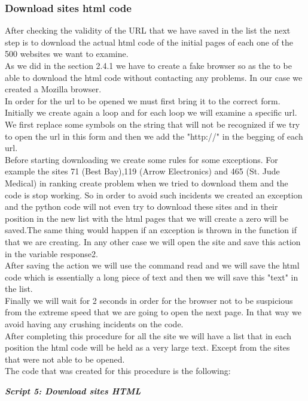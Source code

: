 \documentclass{article}
\begin{document}
\subsubsection{Download sites html code}
After checking the validity of the URL that we have saved in the list the next step is to download the actual html code of the initial pages of each one of the 500 websites we want to examine.\\
As we did in the section 2.4.1 we have to create a fake browser so as the to be able to download the html code without contacting any problems. In our case we created a Mozilla browser.\\
In order for the url to be opened we must first bring it to the correct form. Initially we create again a loop and for each loop we will examine a specific url. We first replace some symbols on the string that will not be recognized if we try to open the url in this form and then we add the "http://" in the begging of each url.\\ 
Before starting downloading we create some rules for some exceptions. For example the sites 71 (Best Bay),119 (Arrow Electronics) and 465 (St. Jude Medical) in ranking create problem when we tried to download them and the code is stop working. So in order to avoid such incidents we created an exception and the python code will not even try to download these sites and in their position in the new list with the html pages that we will create a zero will be saved.The same thing would happen if an exception is thrown in the function if that we are creating. In any other case we will open the site and save this action in the variable response2.\\
After saving the action we will use the command read and we will save the html code which is essentially a long piece of text and then we will save this "text" in the list.\\
Finally we will wait for 2 seconds in order for the browser not to be suspicious from the extreme speed that we are going to open the next page. In that way we avoid having any crushing incidents on the code.\\
After completing this procedure for all the site we will have a list that in each position the html code will be held as a very large text. Except from the sites that were not able to be opened.\\
The code that was created for this procedure is the following:
\begin{center}
\textit{\textbf{Script 5: Download sites HTML}}
\end{center}
\end{document}
